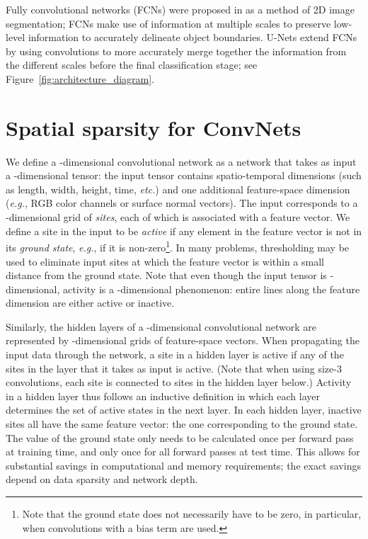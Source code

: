 \documentclass[10pt,twocolumn,letterpaper]{article}
\begin{document}
Fully convolutional networks (FCNs) were proposed in \cite{long2015fully} as a method of 2D image segmentation; FCNs make use of information at multiple scales to preserve low-level information to accurately delineate object boundaries.
U-Nets \cite{ronneberger2015unet} extend FCNs by using convolutions to more accurately merge together the information from the different scales before the final classification stage; see Figure~\ref{fig:architecture_diagram}.
 \section{Spatial sparsity for ConvNets}
We define a -dimensional convolutional network as a network that
takes as input a -dimensional tensor: the input tensor contains  spatio-temporal
dimensions (such as length, width, height, time, \emph{etc.}) and one additional feature-space
dimension (\emph{e.g.}, RGB color channels or surface normal vectors).
The input corresponds to a -dimensional grid of \emph{sites}, each of which is
associated with a feature vector. We define a site in the input to be \emph{active} if any element in the feature vector is not in its \emph{ground state}, \emph{e.g.}, if it is non-zero\footnote{Note that the ground state does not necessarily have to be zero, in particular, when convolutions with a bias term are used.}. In many problems, thresholding
may be used to eliminate input sites at which the feature
vector is within a small distance from the ground state. Note that even though the input tensor is -dimensional,
activity is a -dimensional phenomenon: entire lines along the feature dimension
are either active or inactive.

Similarly, the hidden layers of a -dimensional convolutional network are represented by -dimensional
grids of feature-space vectors. When propagating the input data through the network,
a site in a hidden layer is active if any of the sites
in the layer that it takes as input is active. (Note that when using size-3 convolutions,
each site is connected to  sites in the hidden layer below.) Activity in a hidden layer thus follows an inductive definition in which each layer determines the set of active states in the next layer. In each hidden layer, inactive
sites all have the same feature vector: the one corresponding to the ground state.
The value of the ground state only needs to be calculated once per forward pass at training time, and only once for all forward passes at test time. This allows for substantial savings in computational and memory requirements; the exact savings depend on data sparsity and network depth.
\end{document}
